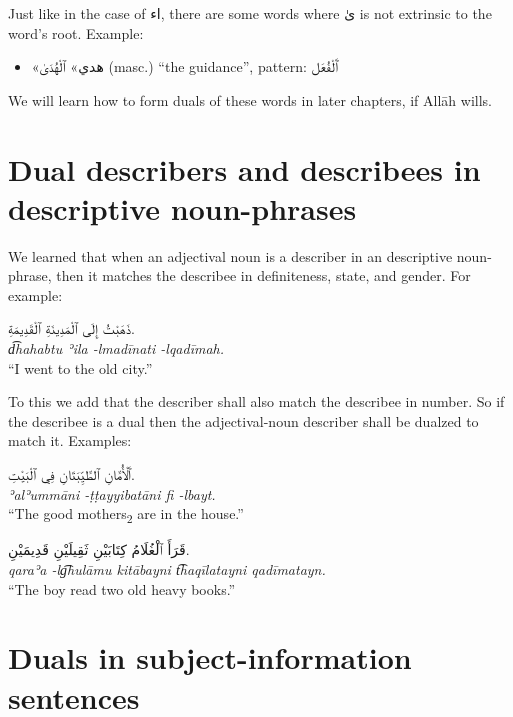 \documentclass[
  10pt,
]{book}
\providecommand{\tightlist}{%
  \setlength{\itemsep}{0pt}\setlength{\parskip}{0pt}}
\begin{document}
Just like in the case of \foreignlanguage{arabic}{اء}, there are some words where \foreignlanguage{arabic}{ىٰ} is not extrinsic to the word's root.
Example:

\begin{itemize}
\tightlist
\item
  \foreignlanguage{arabic}{«هدي»} \foreignlanguage{arabic}{ٱلْهُدَىٰ} (masc.) \enquote{the guidance}, pattern: \foreignlanguage{arabic}{ٱَلْفُعَل}
\end{itemize}

We will learn how to form duals of these words in later chapters, if Allāh wills.

\section{Dual describers and describees in descriptive noun-phrases}\label{dual-describers-and-describees-in-descriptive-noun-phrases}

We learned that when an adjectival noun is a describer in an descriptive noun-phrase, then it matches the describee in definiteness, state, and gender. For example:

\foreignlanguage{arabic}{ذَهَبْتُ إِلَى ٱلْمَدِينَةِ ٱلْقَدِيمَةِ.}\\
\emph{d͡hahabtu ʾila -lmadīnati -lqadīmah.}\\
\enquote{I went to the old city.}

To this we add that the describer shall also match the describee in number. So if the describee is a dual then the adjectival-noun describer shall be dualzed to match it. Examples:

\foreignlanguage{arabic}{ٱَلْأُمَّانِ ٱلطَّيِّبَتَانِ فِي ٱلْبَيْتِ.}\\
\emph{ʾalʾummāni -ṭṭayyibatāni fi -lbayt.}\\
\enquote{The good mothers\textsubscript{2} are in the house.}

\foreignlanguage{arabic}{قَرَأَ ٱلْغُلَامُ کِتَابَيْنِ ثَقِيلَيْنِ قَدِيمَيْنِ.}\\
\emph{qaraʾa -lg͡hulāmu kitābayni t͡haqīlatayni qadīmatayn.}\\
\enquote{The boy read two old heavy books.}

\section{Duals in subject-information sentences}\label{duals-in-subject-information-sentences}
\end{document}

